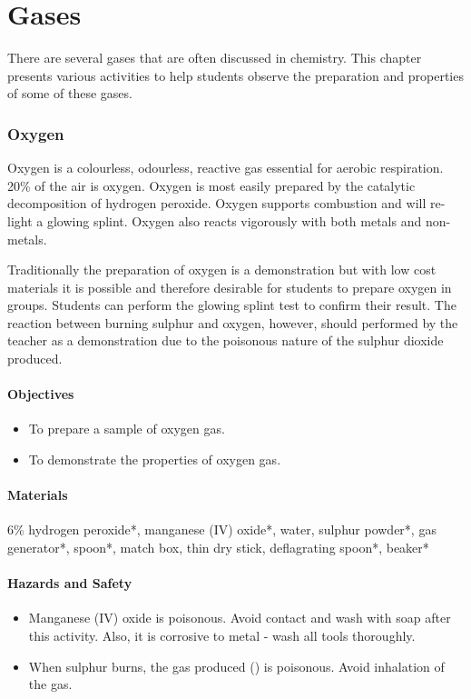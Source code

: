 \chapter{Gases}

There are several gases that are often discussed in chemistry. This chapter presents various activities to help students observe the preparation and properties of some of these gases.

\subsection{Oxygen}

Oxygen is a colourless, odourless, reactive gas essential for aerobic respiration. 20\% of the air is oxygen. Oxygen is most easily prepared by the catalytic decomposition of hydrogen peroxide. Oxygen supports combustion and will re-light a glowing splint. Oxygen also reacts vigorously with both metals and non-metals.

Traditionally the preparation of oxygen is a demonstration but with low cost materials it is possible and therefore desirable for students to prepare oxygen in groups. Students can perform the glowing splint test to confirm their result. The reaction between burning sulphur and oxygen, however, should performed by the teacher as a demonstration due to the poisonous nature of the sulphur dioxide produced.

\subsubsection*{Objectives}
\begin{itemize}
\item{To prepare a sample of oxygen gas.}
\item{To demonstrate the properties of oxygen gas.}
\end{itemize}

\subsubsection*{Materials}
6\% hydrogen peroxide*, manganese (IV) oxide*, water, sulphur powder*, gas generator*, spoon*, match box, thin dry stick, deflagrating spoon*, beaker*

\subsubsection*{Hazards and Safety}
\begin{itemize}
\item{Manganese (IV) oxide is poisonous. Avoid contact and wash with soap after this activity. Also, it is corrosive to metal - wash all tools thoroughly.}
\item{When sulphur burns, the gas produced () is poisonous. Avoid inhalation of the gas.}
\end{itemize}


